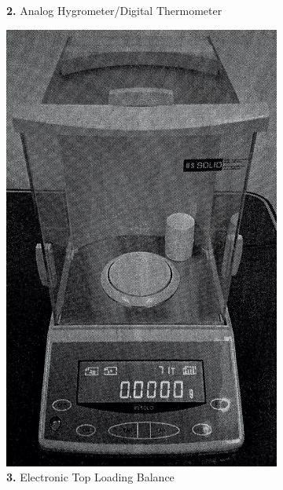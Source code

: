 \begin{figure}[!h]
\begin{subfigure}[t]{.4\textwidth}
    \caption{\textbf{2.} Analog Hygrometer/Digital Thermometer}
  \end{subfigure}

  \medskip

  \begin{subfigure}[t]{.4\textwidth}
    \centering
    \includegraphics[width=\linewidth]{Pictures/Apparatus/Experiment 1/three.png}
    \caption{\textbf{3.} Electronic Top Loading Balance}
  \end{subfigure}
  \hfill
  \begin{subfigure}[t]{.4\textwidth}
    \centering

\end{subfigure}
\end{figure}
